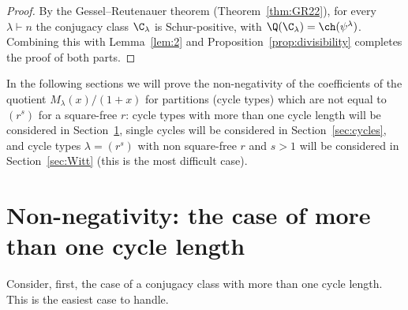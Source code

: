 \begin{proof}
    By the Gessel--Reutenauer theorem (Theorem~\ref{thm:GR22}), for every $\lambda\vdash n$ the conjugacy class $\C_\lambda$ 
    is Schur-positive, with $\Q(\C_\lambda) = \ch(\psi^\lambda)$.
    Combining this with Lemma~\ref{lem:2}  and  Proposition~\ref{prop:divisibility} completes the proof of both parts.
\end{proof}

In the following sections we will prove the non-negativity of the coefficients of the quotient $M_\lambda(x)/(1+x)$ for partitions (cycle types) which are not equal to $(r^s)$ for a square-free $r$: 
cycle types with more than one cycle length will be considered in Section~\ref{sec:distinct}, 
single cycles will be considered in Section~\ref{sec:cycles},
and cycle types $\lambda = (r^s)$ with non square-free $r$ and $s>1$ will be considered in Section~\ref{sec:Witt} (this is the most difficult case).


\section{Non-negativity: the case of more than one cycle length}
\label{sec:distinct}

Consider, first, the case of a conjugacy class with more than one cycle length. This is the easiest case to handle.
